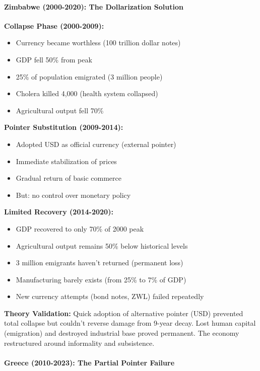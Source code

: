 \documentclass[11pt,oneside]{book}
\begin{document}
\paragraph{Zimbabwe (2000-2020): The Dollarization Solution}

\textbf{Collapse Phase (2000-2009):}
\begin{itemize}
\item Currency became worthless (100 trillion dollar notes)
\item GDP fell 50\% from peak
\item 25\% of population emigrated (3 million people)
\item Cholera killed 4,000 (health system collapsed)
\item Agricultural output fell 70\%
\end{itemize}

\textbf{Pointer Substitution (2009-2014):}
\begin{itemize}
\item Adopted USD as official currency (external pointer)
\item Immediate stabilization of prices
\item Gradual return of basic commerce
\item But: no control over monetary policy
\end{itemize}

\textbf{Limited Recovery (2014-2020):}
\begin{itemize}
\item GDP recovered to only 70\% of 2000 peak
\item Agricultural output remains 50\% below historical levels
\item 3 million emigrants haven't returned (permanent loss)
\item Manufacturing barely exists (from 25\% to 7\% of GDP)
\item New currency attempts (bond notes, ZWL) failed repeatedly
\end{itemize}

\textbf{Theory Validation:} Quick adoption of alternative pointer (USD) prevented total collapse but couldn't reverse damage from 9-year decay. Lost human capital (emigration) and destroyed industrial base proved permanent. The economy restructured around informality and subsistence.

\paragraph{Greece (2010-2023): The Partial Pointer Failure}
\end{document}
